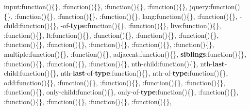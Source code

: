 {\begin{DoxyParamCaption}
\textquotesingle{}input\textquotesingle{}\+:function()\{\}, \textquotesingle{}\+:function()\{\}, \textquotesingle{}\+:function()\{\}, \textquotesingle{}\+:function()\{\}, \textquotesingle{}jquery\textquotesingle{}\+:function()\{\}, \textquotesingle{}\+:function()\{\}, \textquotesingle{}\+:function()\{\}, \textquotesingle{}\+:function()\{\}, \textquotesingle{}lang\textquotesingle{}\+:function()\{\}, \textquotesingle{}\+:function()\{\}, -\/child\textquotesingle{}\+:function()\{\}, -\/of-\/{\bf type}\textquotesingle{}\+:function()\{\}, \textquotesingle{}\+:function()\{\}, \textquotesingle{}live\textquotesingle{}\+:function()\{\}, \textquotesingle{}\+:function()\{\}, \textquotesingle{}lt\textquotesingle{}\+:function()\{\}, \textquotesingle{}\+:function()\{\}, \textquotesingle{}\+:function()\{\}, \textquotesingle{}\+:function()\{\}, \textquotesingle{}\+:function()\{\}, \textquotesingle{}\+:function()\{\}, \textquotesingle{}\+:function()\{\}, \textquotesingle{}\+:function()\{\}, \textquotesingle{}\+:function()\{\}, \textquotesingle{}multiple\textquotesingle{}\+:function()\{\}, \textquotesingle{}\+:function()\{\},  adjacent\textquotesingle{}\+:function()\{\},  {\bf siblings}\textquotesingle{}\+:function()\{\}, \textquotesingle{}\+:function()\{\}, \textquotesingle{}\+:function()\{\}, \textquotesingle{}\+:function()\{\}, \textquotesingle{}nth-\/child\textquotesingle{}\+:function()\{\}, \textquotesingle{}nth-\/{\bf last}-\/child\textquotesingle{}\+:function()\{\}, \textquotesingle{}nth-\/{\bf last}-\/of-\/{\bf type}\textquotesingle{}\+:function()\{\}, \textquotesingle{}nth-\/of-\/{\bf type}\textquotesingle{}\+:function()\{\}, \textquotesingle{}odd\textquotesingle{}\+:function()\{\}, \textquotesingle{}\+:function()\{\}, \textquotesingle{}\+:function()\{\}, \textquotesingle{}\+:function()\{\}, \textquotesingle{}\+:function()\{\}, \textquotesingle{}\+:function()\{\}, \textquotesingle{}only-\/child\textquotesingle{}\+:function()\{\}, \textquotesingle{}only-\/of-\/{\bf type}\textquotesingle{}\+:function()\{\}, \textquotesingle{}\+:function()\{\}, \textquotesingle{}\+:function()\{\}, \textquotesingle{}\+:function()\{\}, \textquotesingle{}\+:function()\{\}, \textquotesingle{}\+:function()\{\}, 
\end{DoxyParamCaption}}
